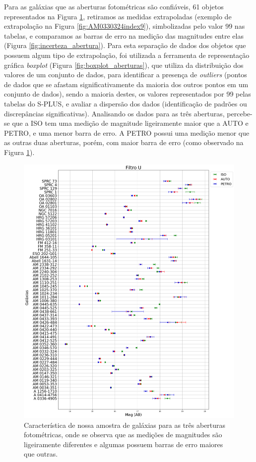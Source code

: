 Para as galáxias que as aberturas fotométricas são confiáveis, 61 objetos representados na Figura \ref{fig:galaxias}, retiramos as medidas extrapoladas (exemplo de extrapolação na Figura \ref{fig:AM0330324index9}), simbolizadas pelo valor 99 nas tabelas, e comparamos as barras de erro na medição das magnitudes entre elas (Figura \ref{fig:incerteza_abertura}). Para esta separação de dados dos objetos que possuem algum tipo de extrapolação, foi utilizada a ferramenta de representação gráfica \emph{boxplot} (Figura \ref{fig:boxplot_aberturas}), que utiliza da distribuição dos valores de um conjunto de dados, para identificar a presença de \emph{outliers} (pontos de dados que se afastam significativamente da maioria dos outros pontos em um conjunto de dados), sendo a maioria destes, os valores representados por 99 pelas tabelas do S-PLUS, e avaliar a dispersão dos dados (identificação de padrões ou discrepâncias significativas). Analisando os dados para as três aberturas, percebe-se que a ISO tem uma medição de magnitude ligeiramente maior que a AUTO e PETRO, e uma menor barra de erro. A PETRO possui uma medição menor que as outras duas aberturas, porém, com maior barra de erro (como observado na Figura \ref{fig:galaxias}).

\begin{figure}[!h]
  \centering 
  \includegraphics[width=1.0\textwidth]{Imagens/galaxias_vertical.png}
  \caption[Nossa amostra vista em todos os filtros para as três aberturas fotométricas.]{Característica de nossa amostra de galáxias para as três aberturas fotométricas, onde se observa que as medições de magnitudes são ligeiramente diferentes e algumas possuem barras de erro maiores que outras.}
  \label{fig:galaxias} 
\end{figure}


